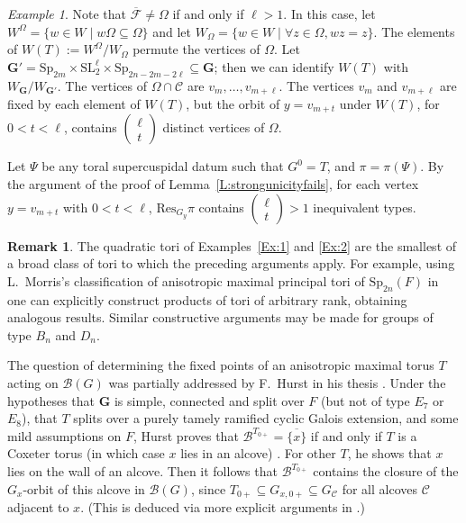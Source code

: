 \documentclass[12pt]{amsart}
\newcommand{\Res}{\mathrm{Res}} %
\newcommand{\ratk}{F}
\newcommand{\SL}{\mathrm{SL}}
\newcommand{\Sp}{\mathrm{Sp}}
\newcommand{\GG}{\mathbf{G}} %
\newcommand{\buil}{\mathcal{B}}
\newcommand{\C}{\mathcal{C}} %
\newcommand{\F}{\mathcal{F}} %
\theoremstyle{plain}
\theoremstyle{definition}
\newtheorem{remark}[theorem]{Remark}
\theoremstyle{remark}
\newtheorem{egr}[theorem]{Example}
\newenvironment{example}{\begin{egr}}{\qedsymbol \end{egr}}
\numberwithin{equation}{section}
\numberwithin{figure}{section}
\begin{document}
\begin{example}
Note that $\overline{\F} \neq \Omega$ if and only if $\ell>1$.  In this case, let $W^\Omega = \{ w\in W\mid w\Omega \subseteq \Omega\}$ and let $W_{\Omega} = \{ w\in W\mid \forall z\in \Omega, wz=z \}$.  The elements of $W(T) := W^\Omega/W_{\Omega}$ permute the vertices of $\Omega$.  Let $\GG' = \Sp_{2m}\times \SL_2^\ell \times \Sp_{2n-2m-2\ell}\subseteq \GG$; then we can identify $W(T)$ with $W_\GG/W_{\GG'}$.  
The vertices of $\Omega\cap \C$ are $v_{m}, \ldots, v_{m+\ell}$.  The vertices $v_m$ and $v_{m+\ell}$ are fixed by each element of $W(T)$, but the orbit of $y=v_{m+t}$ under $W(T)$, for $0<t<\ell$, contains $\left(\begin{smallmatrix} \ell\\ t\end{smallmatrix}\right)$ distinct vertices of $\Omega$.  

Let $\Psi$ be any toral supercuspidal datum such that $G^0=T$, and $\pi=\pi(\Psi)$.  By the argument of the proof of Lemma~\ref{L:strongunicityfails}, for each vertex $y=v_{m+t}$ with $0<t<\ell$, $\Res_{G_y}\pi$ contains $\left(\begin{smallmatrix} \ell\\ t\end{smallmatrix}\right)>1$ inequivalent types.
\end{example}

\begin{remark}
The quadratic tori of Examples~\ref{Ex:1} and \ref{Ex:2} are the smallest of a broad class of tori to which the preceding arguments apply.  For example, using L.~Morris's classification of anisotropic maximal  principal tori of $\Sp_{2n}(\ratk)$ in \cite{Morris1991} one can explicitly construct products of tori of arbitrary rank, obtaining analogous results.  Similar constructive arguments may be made for groups of type $B_n$ and $D_n$.  
\end{remark}



The question of determining the fixed points of an anisotropic maximal  torus $T$ acting on $\buil(G)$ was partially addressed by F.~Hurst in his thesis \cite{Hurstthesis}.  
Under the hypotheses that $\GG$ is simple, connected and split over $\ratk$ (but not of type $E_7$ or $E_8$), that $T$ splits over a purely tamely ramified cyclic Galois extension, and some mild assumptions on $\ratk$, Hurst proves that $\buil^{T_{0+}} = \overline{\{x\}}$ if and only if $T$ is a Coxeter torus (in which case $x$ lies in an alcove) \cite[Satz 13.14]{Hurstthesis}.  For other $T$, he shows that $x$ lies on the wall of an alcove.  Then it follows that $\buil^{T_{0+}}$ contains the closure of the $G_x$-orbit of this alcove in $\buil(G)$, since $T_{0+}\subseteq G_{x,0+} \subseteq G_{\C}$ for all alcoves $\C$ adjacent to $x$.  (This is deduced via more explicit arguments in \cite[Satz 13.15]{Hurstthesis}.) 
\end{document}
